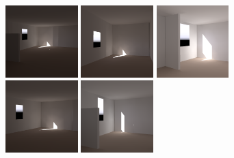\begin{figure}[t]

\includegraphics[width=1.1in]{../gi2012_userstudy/images/renderings/ground_truth/mrc331_camera_chris_march.png} \hfill  %
\includegraphics[width=1.1in]{../gi2012_userstudy/images/renderings/renovations/065_camera_chris_march.png} \hfill %
\includegraphics[width=1.1in]{../gi2012_userstudy/images/renderings/renovations/031_camera_chris_march.png} \hfill   %
\includegraphics[width=1.1in]{../gi2012_userstudy/images/renderings/renovations/063_camera_chris_march_crop.png} \hfill   %
\includegraphics[width=1.1in]{../gi2012_userstudy/images/renderings/renovations/050_camera_chris_march.png} \hfill   %

\end{figure}

